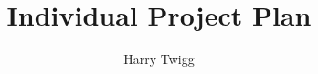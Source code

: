 \documentclass[a4paper,12pt,twoside]{report}
\begin{document}
\title{\LARGE {\bf Individual Project Plan}\\
 \vspace*{6mm}
}

\author{Harry Twigg}

\normallinespacing
\maketitle

\body




\appendix

%
%
\end{document}
